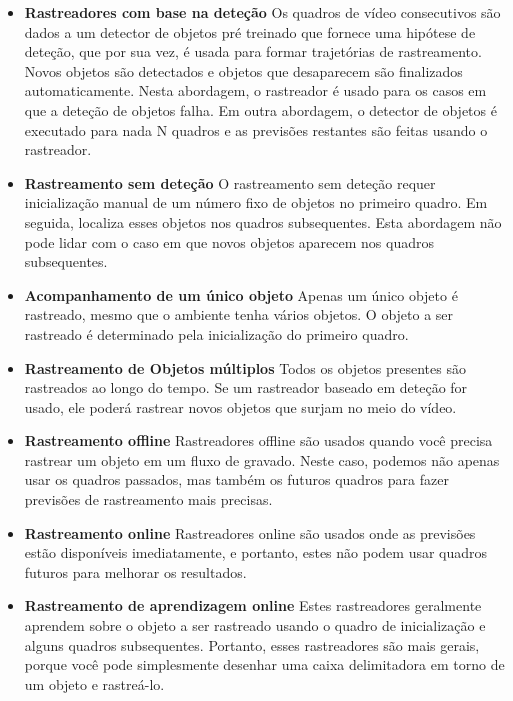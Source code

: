 \begin{itemize}
    \item \textbf{Rastreadores com base na deteção}
    \newline Os quadros de vídeo consecutivos são dados a um detector de objetos pré treinado que fornece uma hipótese de deteção, que por sua vez, é usada para formar trajetórias de rastreamento. Novos objetos são detectados e objetos que desaparecem são finalizados automaticamente. Nesta abordagem, o rastreador é usado para os casos em que a deteção de objetos falha. Em outra abordagem, o detector de objetos é executado para nada N quadros e as previsões restantes são feitas usando o rastreador.
    \item \textbf{Rastreamento sem deteção}
    \newline O rastreamento sem deteção requer inicialização manual de um número fixo de objetos no primeiro quadro. Em seguida, localiza esses objetos nos quadros subsequentes. Esta abordagem não pode lidar com o caso em que novos objetos aparecem nos quadros subsequentes.
    \item \textbf{Acompanhamento de um único objeto}
    \newline Apenas um único objeto é rastreado, mesmo que o ambiente tenha vários objetos. O objeto a ser rastreado é determinado pela inicialização do primeiro quadro.
    \item \textbf{Rastreamento de Objetos múltiplos}
    \newline Todos os objetos presentes são rastreados ao longo do tempo. Se um rastreador baseado em deteção for usado, ele poderá rastrear novos objetos que surjam no meio do vídeo.
    \item \textbf{Rastreamento offline}
    \newline Rastreadores offline são usados quando você precisa rastrear um objeto em um fluxo de gravado. Neste caso, podemos não apenas usar os quadros passados, mas também os futuros quadros para fazer previsões de rastreamento mais precisas.
    \item \textbf{Rastreamento online}
    \newline Rastreadores online são usados onde as previsões estão disponíveis imediatamente, e portanto, estes não podem usar quadros futuros para melhorar os resultados.
    \item \textbf{Rastreamento de aprendizagem online}
    \newline Estes rastreadores geralmente aprendem sobre o objeto a ser rastreado usando o quadro de inicialização e alguns quadros subsequentes. Portanto, esses rastreadores são mais gerais, porque você pode simplesmente desenhar uma caixa delimitadora em torno de um objeto e rastreá-lo.

\end{itemize}
